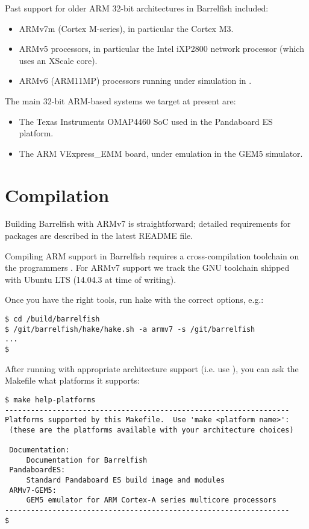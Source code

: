 \documentclass[a4paper,twoside]{report} %
\begin{document}
Past support for older ARM 32-bit architectures in Barrelfish included:
\begin{itemize}
\item ARMv7m (Cortex M-series), in particular the Cortex M3. 
\item ARMv5 processors, in particular the Intel iXP2800 network
  processor (which uses an XScale core). 
\item ARMv6 (ARM11MP) processors running under simulation in
  . 
\end{itemize}

The main 32-bit ARM-based systems we target at present are:
\begin{itemize}
\item The Texas Instruments OMAP4460 SoC used in the Pandaboard ES
  platform. 
\item The ARM VExpress\_EMM board, under emulation in the GEM5
  simulator. 
\end{itemize}

\chapter{Compilation}
\label{sec:armcompile}

Building Barrelfish with ARMv7 is straightforward; detailed
requirements for packages are described in the latest README file.

Compiling ARM support in Barrelfish requires a cross-compilation
toolchain on the programmers .  For ARMv7 support we
track the GNU toolchain shipped with Ubuntu LTS  (14.04.3 at time of
writing). 

Once you have the right tools, run hake with the correct options,
e.g.:
\begin{lstlisting}
$ cd /build/barrelfish
$ /git/barrelfish/hake/hake.sh -a armv7 -s /git/barrelfish 
...
$
\end{lstlisting}

After running  with appropriate architecture support
(i.e. use ), you can ask the Makefile what platforms it
supports:

\begin{lstlisting}
$ make help-platforms
------------------------------------------------------------------
Platforms supported by this Makefile.  Use 'make <platform name>':
 (these are the platforms available with your architecture choices)

 Documentation:
	 Documentation for Barrelfish
 PandaboardES:
	 Standard Pandaboard ES build image and modules
 ARMv7-GEM5:
	 GEM5 emulator for ARM Cortex-A series multicore processors
------------------------------------------------------------------
$ 
\end{lstlisting}
\end{document}
